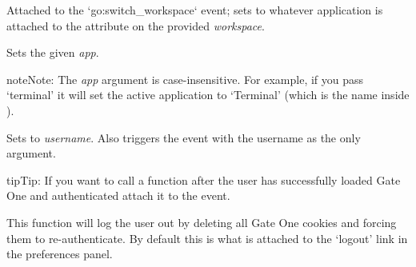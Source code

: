 \documentclass[letterpaper,10pt,openany]{sphinxmanual}
\begin{document}
\begin{fulllineitems}
\begin{fulllineitems}
\begin{fulllineitems}
\end{fulllineitems}



\begin{fulllineitems}
\label{Developer/js_gateone:GateOne.User.workspaceApp}
Attached to the `go:switch\_workspace` event; sets  to whatever application is attached to the  attribute on the provided \emph{workspace}.

\end{fulllineitems}



\begin{fulllineitems}
\label{Developer/js_gateone:GateOne.User.setActiveApp}
Sets  the given \emph{app}.

\begin{notice}{note}{Note:}
The \emph{app} argument is case-insensitive.  For example, if you pass `terminal' it will set the active application to `Terminal' (which is the name inside ).
\end{notice}

\end{fulllineitems}



\begin{fulllineitems}
\label{Developer/js_gateone:GateOne.User.setUsernameAction}
Sets  to \emph{username}.  Also triggers the  event with the username as the only argument.

\begin{notice}{tip}{Tip:}
If you want to call a function after the user has successfully loaded Gate One and authenticated attach it to the  event.
\end{notice}

\end{fulllineitems}



\begin{fulllineitems}
\label{Developer/js_gateone:GateOne.User.logout}
This function will log the user out by deleting all Gate One cookies and forcing them to re-authenticate.  By default this is what is attached to the `logout' link in the preferences panel.


\end{fulllineitems}
\end{fulllineitems}
\end{fulllineitems}
\end{document}
